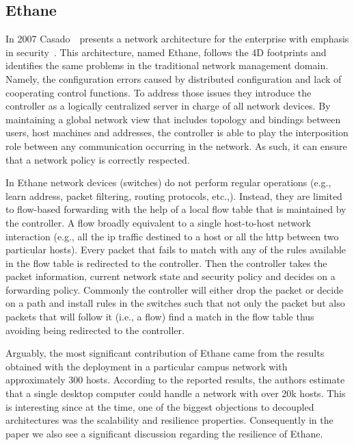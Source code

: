 \subsection{Ethane}
In 2007  Casado~\etal\ presents a network architecture for the enterprise with emphasis in security~\cite{Casado:2007kb}. 
This architecture, named Ethane, follows the 4D footprints and identifies the same problems in the traditional network management domain. Namely, the configuration errors caused by distributed configuration and lack of cooperating control functions. 
To address those issues they introduce the controller as a logically centralized server in charge of all network devices.
By maintaining a global network view that includes topology and  bindings between users, host machines and addresses, the controller is able to play the interposition role between any communication occurring in the network. As such, it can ensure that a network policy is correctly respected. 


In Ethane network devices (switches) do not perform regular operations (e.g., learn address, packet filtering, routing protocols, etc.,).
Instead, they are limited  to flow-based forwarding with the help of a local flow table that is maintained by the controller. A flow broadly equivalent to a single host-to-host network interaction (e.g., all the \gls{ip} traffic destined to a host or  all the \gls{http} between two particular hosts). 
Every packet that fails to match with any of the rules available in the flow table is redirected to the controller. Then the controller takes the packet information, current network state and security policy and decides on a forwarding policy. Commonly the controller will either drop the packet or decide on a path and install rules in the switches such that  not only the packet but also packets that will follow it (i.e., a flow) find a match in the flow table thus avoiding being redirected to the controller. 


Arguably, the most significant contribution of Ethane came from the results obtained with the deployment in a particular campus network with approximately 300 hosts. 
According to the reported results, the authors estimate that a single desktop computer could handle a network with over 20k hosts.  
This is interesting since at the time,  one of the biggest objections to decoupled architectures was the scalability and resilience properties. 
Consequently  in the paper we also see a significant discussion regarding the resilience of Ethane. 

